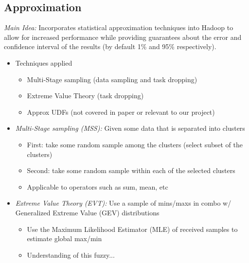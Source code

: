 

\subsection{Approximation}


\emph{Main Idea:} Incorporates statistical approximation techniques into
Hadoop to allow for increased performance while providing guarantees about
the error and confidence interval of the results (by default 1\% and 95\%
respectively).
\begin{itemize}

    \item Techniques applied
    \begin{itemize}
        \item Multi-Stage sampling (data sampling and task dropping)
        \item Extreme Value Theory (task dropping)
        \item Approx UDFs (not covered in paper or relevant to our project)
    \end{itemize}

    \item \emph{Multi-Stage sampling (MSS):} Given some data that is separated
      into clusters
    \begin{itemize}
        \item First: take some random sample among the clusters (select subset
          of the clusters)
        \item Second: take some random sample within each of the selected
          clusters
        \item Applicable to operators such as sum, mean, etc
    \end{itemize} 

    \item \emph{Extreme Value Theory (EVT):} Use a sample of mins/maxs in combo
      w/ Generalized Extreme Value (GEV) distributions
    \begin{itemize}
        \item Use the Maximum Likelihood Estimator (MLE) of received samples to
          estimate global max/min
        \item Understanding of this fuzzy...
    \end{itemize}


\end{itemize}
